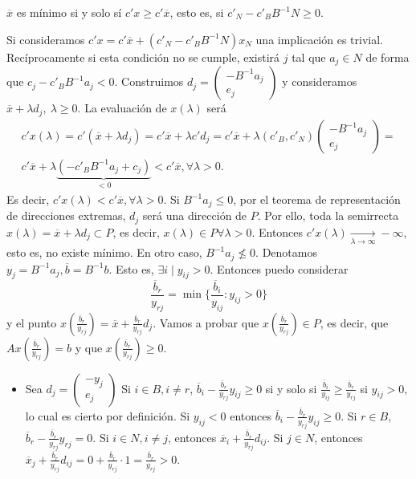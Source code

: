 \documentclass[PM.tex]{subfiles}
\begin{document}
\begin{prop} $\overline{x}$ es mínimo si y solo sí $c'x\geq c'\overline{x}$, esto es, si $c'_N-c'_BB^{-1}N\geq 0$. 
\end{prop}
\begin{dem}
Si consideramos $c'x= c'\overline{x}+(c'_N-c'_BB^{-1}N)x_N$ una implicación es trivial. Recíprocamente si esta condición no se cumple, existirá $j$ tal que $a_j\in N$ de forma que $c_j-c'_BB^{-1}a_j<0$. 
Construimos $d_j=\begin{pmatrix}
-B^{-1}a_j\\
e_j
\end{pmatrix}$ y consideramos $\overline{x}+\lambda d_j,\ \lambda\geq 0$. La evaluación de $x(\lambda)$ será 
\begin{gather*}
c'x(\lambda)=c'(\overline{x}+\lambda d_j)=c'\overline{x}+\lambda c'd_j=c'\overline{x}+\lambda(c'_B, c'_N)\begin{pmatrix}
-B^{-1}a_j\\
e_j
\end{pmatrix}=\\
c'\overline{x}+\lambda\underbrace{(-c'_B B^{-1}a_j +c_j)}_{<0}< c'\overline{x}, \forall\lambda >0.
\end{gather*}
Es decir, $c'x(\lambda)<c'\overline{x}, \forall\lambda >0$. Si $B^{-1}a_j\leq 0$, por el teorema de representación de direcciones extremas, $d_j$ será una dirección de $P$. Por ello, toda la semirrecta $x(\lambda)=\overline{x}+\lambda d_j\subset P$, es decir, $x(\lambda)\in P\forall\lambda >0$. Entonces $c'x(\lambda)\underset{\lambda\to\infty}{\longrightarrow} -\infty$, esto es, no existe mínimo.
En otro caso, $B^{-1}a_j\not\leq 0$. Denotamos $y_j=B^{-1}a_j, \overline{b}=B^{-1}b$. Esto es, $\exists i\mid y_{ij}>0$. Entonces puedo considerar 
\[
\frac{\overline{b}_r}{y_{rj}}=\min\{\frac{\overline{b}_i}{y_{ij}}:y_{ij}>0\}
\]
y el punto $x(\frac{\overline{b}_r}{y_{rj}})=\overline{x}+\frac{\overline{b}_r}{y_{rj}}d_j$. Vamos a probar que $x(\frac{\overline{b}_r}{y_{rj}})\in P$, es decir, que $Ax(\frac{\overline{b}_r}{y_{rj}})=b$ y que $x(\frac{\overline{b}_r}{y_{rj}})\geq 0$.
\begin{itemize}
\item Sea $d_j=\begin{pmatrix}
-y_j\\
e_j
\end{pmatrix}$ Si $i\in B, i\neq r$, $\overline{b}_i-\frac{\overline{b}_r}{y_{rj}}y_{ij}\geq 0$ si y solo si $\frac{\overline{b}_i}{y_{ij}}\geq\frac{\overline{b}_r}{y_{rj}}$ si $y_{ij}>0$, lo cual es cierto por definición. Si $y_{ij}<0$ entonces $\overline{b}_i-\frac{\overline{b}_r}{y_{rj}}y_{ij}\geq 0$. Si $r\in B$, $\overline{b}_r-\frac{\overline{b}_r}{y_{rj}}y_{rj}=0$. Si $i\in N, i\neq j$, entonces $\overline{x}_i+\frac{\overline{b}_r}{y_{rj}}d_{ij}$. Si $j\in N$, entonces $\overline{x}_j+\frac{\overline{b}_r}{y_{rj}}d_{ij}=0+\frac{\overline{b}_r}{y_{rj}}\cdot 1=\frac{\overline{b}_r}{y_{rj}}>0$.


\end{itemize}
\end{dem}
\end{document}
